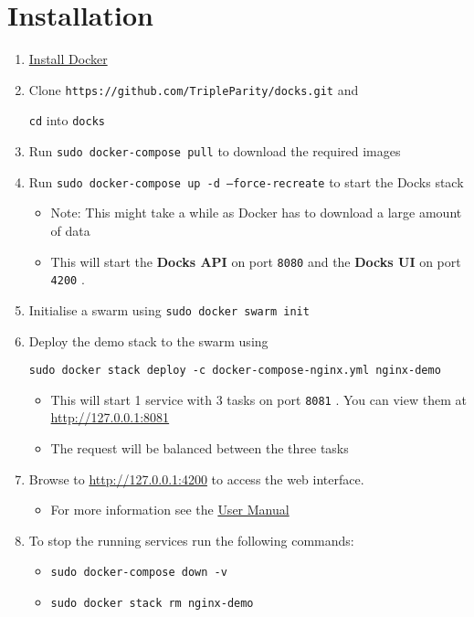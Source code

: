 \documentclass[]{article}
\providecommand{\tightlist}{%
	\setlength{\itemsep}{0pt}\setlength{\parskip}{0pt}}
\let\oldtexttt\texttt
\renewcommand{\texttt}[1]{
	\colorbox{Light}{\oldtexttt{#1}}
}
\begin{document}
\section{Installation}
\begin{enumerate}
	\def\labelenumi{\arabic{enumi}.}
	\tightlist
	\item
	\href{https://docs.docker.com/install/}{Install Docker}
	\item
	Clone \texttt{https://github.com/TripleParity/docks.git} and
	\texttt{cd} into \texttt{docks}
	\item
	Run \texttt{sudo\ docker-compose\ pull} to download the required
	images
	\item
	Run \texttt{sudo\ docker-compose\ up\ -d\ --force-recreate} to start
	the Docks stack
	
	\begin{itemize}
		\tightlist
		\item
		Note: This might take a while as Docker has to download a large
		amount of data
		\item
		This will start the \textbf{Docks API} on port \texttt{8080} and the
		\textbf{Docks UI} on port \texttt{4200}.
	\end{itemize}
	\item
	Initialise a swarm using \texttt{sudo\ docker\ swarm\ init}
	\item
	Deploy the demo stack to the swarm using
	\texttt{sudo\ docker\ stack\ deploy\ -c\ docker-compose-nginx.yml\ nginx-demo}
	
	\begin{itemize}
		\tightlist
		\item
		This will start 1 service with 3 tasks on port \texttt{8081}. You
		can view them at \url{http://127.0.0.1:8081}
		\item
		The request will be balanced between the three tasks
	\end{itemize}
	\item
	Browse to \url{http://127.0.0.1:4200} to access the web interface.
	
	\begin{itemize}
		\tightlist
		\item
		For more information see the \href{https://tripleparity.github.io/docs-bin/user-manual.pdf}{User Manual}
	\end{itemize}
	\item
	To stop the running services run the following commands:
	
	\begin{itemize}
		\tightlist
		\item
		\texttt{sudo\ docker-compose\ down\ -v}
		\item
		\texttt{sudo\ docker\ stack\ rm\ nginx-demo}
	\end{itemize}
\end{enumerate}
\end{document}
